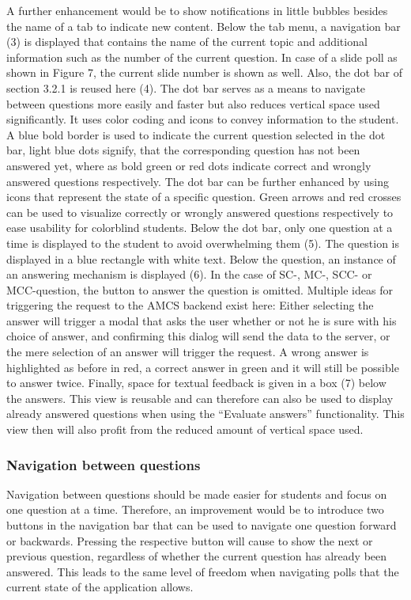 A further enhancement would be to show notifications in little bubbles besides the name of a tab to indicate new content.
 Below the tab menu, a navigation bar (3) is displayed that contains the name of the current topic and additional information such as the number of the current question. In case of a slide poll as shown in Figure 7, the current slide number is shown as well.
Also, the dot bar of section 3.2.1 is reused here (4). The dot bar serves as a means to navigate between questions more easily and faster but also reduces vertical space used significantly. It uses color coding and icons to convey information to the student. A blue bold border is used to indicate the current question selected in the dot bar, light blue dots signify, that the corresponding question has not been answered yet, where as bold green  or red dots indicate correct and wrongly answered questions respectively. The dot bar can be further enhanced by using icons that represent the state of a specific question. Green arrows and red crosses can be used to visualize correctly or wrongly answered questions respectively to ease usability for colorblind students. Below the dot bar, only one question at a time is displayed to the student to avoid overwhelming them (5). The question is displayed in a blue rectangle with white text. Below the question, an instance of an answering mechanism is displayed (6). In the case of SC-, MC-, SCC- or MCC-question, the button to answer the question is omitted. Multiple ideas for triggering the request to the AMCS backend exist here: Either selecting the answer will trigger a modal that asks the user whether or not he is sure with his choice of answer, and confirming this dialog will send the data to the server, or the mere selection of an answer will trigger the request.  A wrong answer is highlighted as before in red, a correct answer in green and it will still be possible to answer twice. Finally, space for textual feedback is given in a box (7) below the answers. This view is reusable and can therefore can also be used to display already answered questions when using the “Evaluate answers” functionality. This view then will also profit from the reduced amount of vertical space used. 

\subsubsection{Navigation between questions}

Navigation between questions should be made easier for students and focus on one question at a time. Therefore, an improvement would be to introduce two buttons in the navigation bar that can be used to navigate one question forward or backwards. Pressing the respective button will cause to show the next or previous question, regardless of whether the current question has already been answered. This leads to the same level of freedom when navigating polls that the current state of the application allows.


